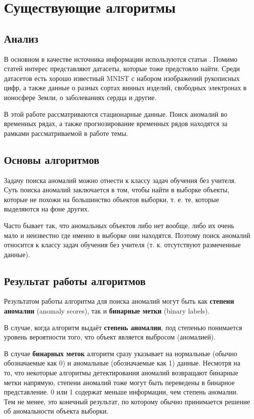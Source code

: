\chapter{Существующие алгоритмы} \label{ch:ch2}

\section{Анализ} \label{sec:ch2/sec1}

В основном в качестве источника информации используются статьи \cite{dai, hodge, vakili, varun, billor, wilkinson}. Помимо статей интерес представляют датасеты, которые тоже предстояло найти. Среди датасетов есть хорошо известный MNIST с набором изображений рукописных цифр, а также данные о разных сортах винных изделий, свободных электронах в ионосфере Земли, о заболеваниях сердца и другие.

В этой работе рассматриваются стационарные данные. Поиск аномалий во временных рядах, а также прогнозирование временных рядов находятся за рамками рассматриваемой в работе темы.

\section{Основы алгоритмов} \label{sec:ch2/sec2}

Задачу поиска аномалий можно отнести к классу задач обучения без учителя. Суть поиска аномалий заключается в том, чтобы найти в выборке объекты, которые не похожи на большинство объектов выборки, т. е. те, которые выделяются на фоне других.

Часто бывает так, что аномальных объектов либо нет вообще, либо их очень мало и неизвестно где именно в выборке они находятся. Поэтому поиск аномалий относится к классу задач обучения без учителя (т. к. отсутствуют размеченные данные).

\section{Результат работы алгоритмов} \label{sec:ch1/sec2}

Результатом работы алгоритма для поиска аномалий могут быть как \textbf{степени аномалии} (anomaly scores), так и \textbf{бинарные метки} (binary labels).

В случае, когда алгоритм выдаёт \textbf{степень аномалии}, под степенью понимается уровень вероятности того, что объект является выбросом (аномалией).

В случае \textbf{бинарных меток} алгоритм сразу указывает на нормальные (обычно обозначаемые как 0) и аномальные (обозначаемые как 1) данные. Несмотря на то, что некоторые алгоритмы детектирования аномалий возвращают бинарные метки напрямую, степени аномалий тоже могут быть переведены в бинарное представление. 0 или 1 содержат меньше информации, чем степень аномалии. Тем не менее, это конечный результат, по которому обычно принимается решение об аномальности объекта выборки.

